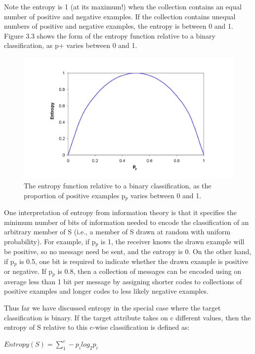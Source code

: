 \documentclass[12pt]{report}
\begin{document}
Note the entropy is 1 (at its maximum!) when the collection contains an equal number of positive and negative examples. If the collection contains unequal numbers of positive and negative examples, the entropy is between 0 and 1. Figure 3.3 shows the form of the entropy function relative to a binary classification, as p+ varies between 0 and 1. 


\begin{figure}[h!]
	\centering
		\includegraphics[scale=0.5]{entropy_graph.jpg}
	\caption{The entropy function relative to a binary classification, as the proportion of positive examples p$_{p}$ varies between 0 and 1.}
	\label{fig:ID3}
\end{figure}




One interpretation of entropy from information theory is that it specifies the minimum number of bits of information needed to encode the classification of an arbitrary member of S (i.e., a member of S drawn at random with uniform probability). For example, if p$_{p}$ is 1, the receiver knows the drawn example will be positive, so no message need be sent, and the entropy is 0. On the other hand, if p$_{p}$ is 0.5, one bit is required to indicate whether the drawn example is positive or negative. If p$_{p}$ is 0.8, then a collection of messages can be encoded using on average less than 1 bit per message by assigning shorter codes to collections of positive examples and longer codes to less likely negative examples.

Thus far we have discussed entropy in the special case where the target classification is binary. If the target attribute takes on c different values, then the entropy of S relative to this c-wise classification is defined as:

\begin{math}
Entropy(S) = \sum_{1}^{c} -p_{i} log_{2} p_{i}
\end{math}
\end{document}
